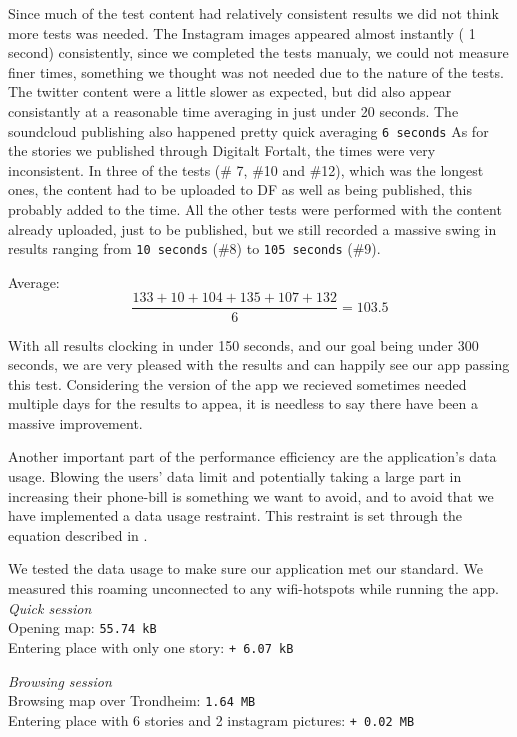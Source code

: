 Since much of the test content had relatively consistent results we did not think more tests was needed. The Instagram images appeared almost instantly ( 1 second) consistently, since we completed the tests manualy, we could not measure finer times, something we thought was not needed due to the nature of the tests. The twitter content were a little slower as expected, but did also appear consistantly at a reasonable time averaging in just under 20 seconds. The soundcloud publishing also happened pretty quick averaging \texttt{6 seconds} As for the stories we published through Digitalt Fortalt, the times were very inconsistent. In three of the tests (\# 7, \#10 and \#12), which was the longest ones, the content had to be uploaded to DF as well as being published, this probably added to the time. All the other tests were performed with the content already uploaded, just to be published, but we still recorded a massive swing in results ranging from \texttt{10 seconds} (\#8) to \texttt{105 seconds} (\#9).


Average: 
\begin{equation}
\frac{133 + 10 + 104 + 135 + 107 + 132}{6} = {103.5}
\end{equation}

With all results clocking in under 150 seconds, and our goal being under 300 seconds, we are very pleased with the results and can happily see our app passing this test. Considering the version of the app we recieved sometimes needed multiple days for the results to appea, it is needless to say there have been a massive improvement.


Another important part of the performance efficiency are the application's data usage. Blowing the users' data limit and potentially taking a large part in increasing their phone-bill is something we want to avoid, and to avoid that we have implemented a data usage restraint. This restraint is set through the equation described in .

We tested the data usage to make sure our application met our standard. We measured this roaming unconnected to any wifi-hotspots while running the app.\\

\emph{Quick session}\\
Opening map: \texttt{55.74 kB}\\
Entering place with only one story: \texttt{+ 6.07 kB}

\emph{Browsing session}\\
Browsing map over Trondheim: \texttt{1.64 MB}\\
Entering place with 6 stories and 2 instagram pictures: \texttt{+ 0.02 MB}

